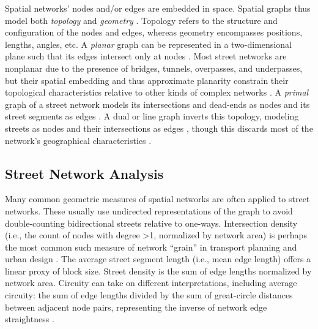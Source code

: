 \documentclass[12pt,letterpaper]{article} %
\begin{document}
Spatial networks' nodes and/or edges are embedded in space. Spatial graphs thus model both \textit{topology} and \textit{geometry} \citep{fischer_spatial_2014}. Topology refers to the structure and configuration of the nodes and edges, whereas geometry encompasses positions, lengths, angles, etc. A \textit{planar} graph can be represented in a two-dimensional plane such that its edges intersect only at nodes \citep{barthelemy_modeling_2008,barthelemy_spatial_2011}. Most street networks are nonplanar due to the presence of bridges, tunnels, overpasses, and underpasses, but their spatial embedding and thus approximate planarity constrain their topological characteristics relative to other kinds of complex networks \citep{boeing_planarity_2020}. A \textit{primal} graph of a street network models its intersections and dead-ends as nodes and its street segments as edges \citep{porta_network_2006-1}. A dual or line graph inverts this topology, modeling streets as nodes and their intersections as edges \citep{porta_network_2006}, though this discards most of the network's geographical characteristics \citep{ratti_space_2004}.

\subsection{Street Network Analysis}

Many common geometric measures of spatial networks are often applied to street networks. These usually use undirected representations of the graph to avoid double-counting bidirectional streets relative to one-ways. Intersection density (i.e., the count of nodes with degree >1, normalized by network area) is perhaps the most common such measure of network \enquote{grain} in transport planning and urban design \citep[e.g.,][]{ewing_travel_2010}. The average street segment length (i.e., mean edge length) offers a linear proxy of block size. Street density is the sum of edge lengths normalized by network area. Circuity can take on different interpretations, including average circuity: the sum of edge lengths divided by the sum of great-circle distances between adjacent node pairs, representing the inverse of network edge straightness \citep{boeing_urban_2019}.
\end{document}
